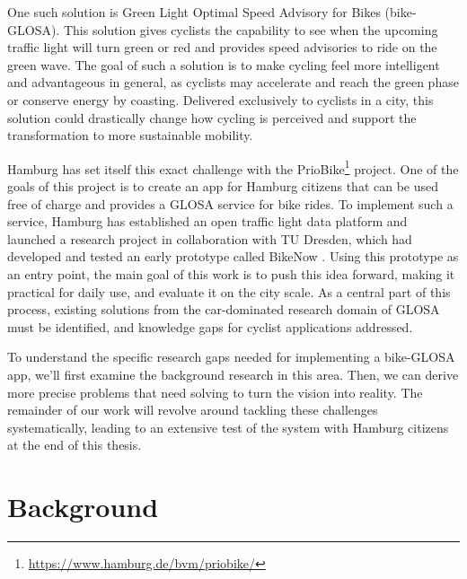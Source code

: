 One such solution is Green Light Optimal Speed Advisory for Bikes (bike-GLOSA). This solution gives cyclists the capability to see when the upcoming traffic light will turn green or red and provides speed advisories to ride on the green wave. The goal of such a solution is to make cycling feel more intelligent and advantageous in general, as cyclists may accelerate and reach the green phase or conserve energy by coasting. Delivered exclusively to cyclists in a city, this solution could drastically change how cycling is perceived and support the transformation to more sustainable mobility.

Hamburg has set itself this exact challenge with the PrioBike\footnote{\url{https://www.hamburg.de/bvm/priobike/}} project. One of the goals of this project is to create an app for Hamburg citizens that can be used free of charge and provides a GLOSA service for bike rides. To implement such a service, Hamburg has established an open traffic light data platform and launched a research project in collaboration with TU Dresden, which had developed and tested an early prototype called BikeNow \cite{frohlich_bikenow_2016, frohlich_bike_2018}. Using this prototype as an entry point, the main goal of this work is to push this idea forward, making it practical for daily use, and evaluate it on the city scale. As a central part of this process, existing solutions from the car-dominated research domain of GLOSA must be identified, and knowledge gaps for cyclist applications addressed. 

To understand the specific research gaps needed for implementing a bike-GLOSA app, we'll first examine the background research in this area. Then, we can derive more precise problems that need solving to turn the vision into reality. The remainder of our work will revolve around tackling these challenges systematically, leading to an extensive test of the system with Hamburg citizens at the end of this thesis.

\section{Background}

